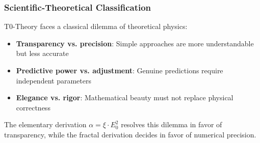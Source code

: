 \documentclass[12pt,a4paper]{article}
\theoremstyle{definition}
\begin{document}
	\subsubsection{Scientific-Theoretical Classification}
	
	T0-Theory faces a classical dilemma of theoretical physics:
	
	\begin{itemize}
		\item \textbf{Transparency vs. precision}: Simple approaches are more understandable but less accurate
		\item \textbf{Predictive power vs. adjustment}: Genuine predictions require independent parameters
		\item \textbf{Elegance vs. rigor}: Mathematical beauty must not replace physical correctness
	\end{itemize}
	
	The elementary derivation $\alpha = \xi \cdot E_0^2$ resolves this dilemma in favor of transparency, while the fractal derivation decides in favor of numerical precision.
	
\end{document}

